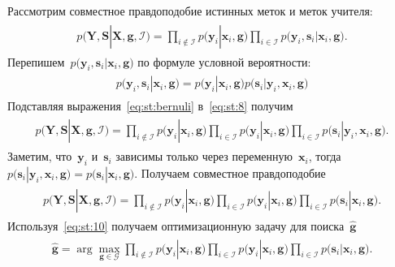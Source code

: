 \documentclass[12pt]{a&t}
\begin{document}
Рассмотрим совместное правдоподобие истинных меток и меток учителя:
\begin{gather}
\label{eq:st:8}
\begin{aligned}
p\bigr(\mathbf{Y}, \mathbf{S}|\mathbf{X}, \mathbf{g}, \mathcal{I}\bigr)=\prod_{i\not\in \mathcal{I}}p\bigr(\mathbf{y}_i|\mathbf{x}_i, \mathbf{g}\bigr)\prod_{i\in \mathcal{I}}p\bigr(\mathbf{y}_i, \mathbf{s}_i|\mathbf{x}_i, \mathbf{g}\bigr).
\end{aligned}
\end{gather}
Перепишем~$p\bigr(\mathbf{y}_i, \mathbf{s}_i|\mathbf{x}_i, \mathbf{g}\bigr)$ по формуле условной вероятности:
\begin{gather}
\label{eq:st:bernuli}
\begin{aligned}
p\bigr(\mathbf{y}_i, \mathbf{s}_i|\mathbf{x}_i, \mathbf{g}\bigr) = p\bigr(\mathbf{y}_i|\mathbf{x}_i, \mathbf{g}\bigr)p\bigr(\mathbf{s}_i|\mathbf{y}_i, \mathbf{x}_i, \mathbf{g}\bigr)
\end{aligned}
\end{gather}
Подставляя выражения~\eqref{eq:st:bernuli} в~\eqref{eq:st:8} получим
\begin{gather}
\label{eq:st:9}
\begin{aligned}
p\bigr(\mathbf{Y}, \mathbf{S}|\mathbf{X}, \mathbf{g}, \mathcal{I}\bigr)=\prod_{i\not\in \mathcal{I}}p\bigr(\mathbf{y}_i|\mathbf{x}_i, \mathbf{g}\bigr)\prod_{i\in \mathcal{I}}p\bigr(\mathbf{y}_i|\mathbf{x}_i, \mathbf{g}\bigr)\prod_{i\in \mathcal{I}}p\bigr(\mathbf{s}_i|\mathbf{y}_i, \mathbf{x}_i, \mathbf{g}\bigr).
\end{aligned}
\end{gather}
Заметим, что~$\mathbf{y}_i$ и~$\mathbf{s}_i$ зависимы только через переменную~$\mathbf{x}_i$, тогда~$p\bigr(\mathbf{s}_i|\mathbf{y}_i, \mathbf{x}_i, \mathbf{g}\bigr)=p\bigr(\mathbf{s}_i|\mathbf{x}_i, \mathbf{g}\bigr)$. Получаем совместное правдоподобие
\begin{gather}
\label{eq:st:10}
\begin{aligned}
p\bigr(\mathbf{Y}, \mathbf{S}|\mathbf{X}, \mathbf{g}, \mathcal{I}\bigr)=\prod_{i\not\in \mathcal{I}}p\bigr(\mathbf{y}_i|\mathbf{x}_i, \mathbf{g}\bigr)\prod_{i\in \mathcal{I}}p\bigr(\mathbf{y}_i|\mathbf{x}_i, \mathbf{g}\bigr)\prod_{i\in \mathcal{I}}p\bigr(\mathbf{s}_i|\mathbf{x}_i, \mathbf{g}\bigr).
\end{aligned}
\end{gather}
Используя~\eqref{eq:st:10} получаем оптимизационную задачу для поиска~$\hat{\mathbf{g}}$
\begin{gather}
\label{eq:st:11}
\begin{aligned}
\hat{\mathbf{g}} = \arg\max_{\mathbf{g}\in \mathcal{G}} \prod_{i\not\in \mathcal{I}}p\bigr(\mathbf{y}_i|\mathbf{x}_i, \mathbf{g}\bigr)\prod_{i\in \mathcal{I}}p\bigr(\mathbf{y}_i|\mathbf{x}_i, \mathbf{g}\bigr)\prod_{i\in \mathcal{I}}p\bigr(\mathbf{s}_i|\mathbf{x}_i, \mathbf{g}\bigr).
\end{aligned}
\end{gather}
\end{document}
